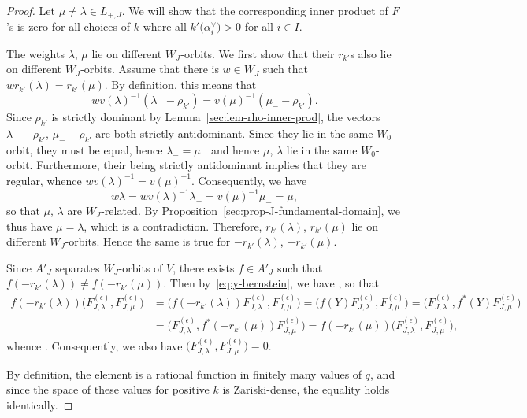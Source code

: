 \documentclass[10pt,a4paper]{amsart}
\theoremstyle{definition}
\numberwithin{equation}{section}
\begin{document}
\begin{proof}
 Let $\mu\ne \lambda\in L_{+,J}$. We will show that the corresponding inner product of $F$'s is zero for
 all choices of $k$ where all $k'\bigl(\alpha_i^\vee\bigr)>0$ for all $i\in I$.

 The weights $\lambda$, $\mu$ lie on different $W_J$-orbits. We first show that their $r_{k'}$s also lie on different $W_J$-orbits.
 Assume that there is $w\in W_J$ such that
 $wr_{k'}(\lambda)=r_{k'}(\mu)$. By definition, this means that
 \[
 wv(\lambda)^{-1}(\lambda_- - \rho_{k'})
 = v(\mu)^{-1}(\mu_- - \rho_{k'}).
 \]
 Since $\rho_{k'}$ is strictly dominant by Lemma~\ref{sec:lem-rho-inner-prod}, the vectors $\lambda_--\rho_{k'}$, $\mu_--\rho_{k'}$ are both
 strictly antidominant. Since they lie in the same $W_0$-orbit, they must be equal, hence
 $\lambda_-=\mu_-$ and hence $\mu$, $\lambda$ lie in the same $W_0$-orbit.
 Furthermore, their being strictly antidominant implies that they are
 regular, whence $wv(\lambda)^{-1} = v(\mu)^{-1}$. Consequently, we have
 \[
 w\lambda = wv(\lambda)^{-1}\lambda_-
 = v(\mu)^{-1}\mu_- = \mu,
 \]
 so that $\mu$, $\lambda$ are $W_J$-related. By Proposition~\ref{sec:prop-J-fundamental-domain}, we thus have $\mu=\lambda$, which is a contradiction.
 Therefore, $r_{k'}(\lambda)$, $r_{k'}(\mu)$ lie on different $W_J$-orbits.
 Hence the same is true for $-r_{k'}(\lambda)$, $-r_{k'}(\mu)$.

 Since $A'_J$ separates $W_J$-orbits of $V$, there exists $f\in A'_J$ such that $f(-r_{k'}(\lambda))\ne f(-r_{k'}(\mu))$. Then
 by~\eqref{eq:y-bernstein}, we have ,
 so that
 \begin{align*}
 f(-r_{k'}(\lambda)) \bigl(F^{(\epsilon)}_{J,\lambda}, F^{(\epsilon)}_{J,\mu}\bigr) &=
 \bigl(f(-r_{k'}(\lambda)) F^{(\epsilon)}_{J,\lambda}, F^{(\epsilon)}_{J,\mu}\bigr)= \bigl(f(Y)F^{(\epsilon)}_{J,\lambda}, F^{(\epsilon)}_{J,\mu}\bigr)= \bigl(F^{(\epsilon)}_{J,\lambda}, f^*(Y)F^{(\epsilon)}_{J,\mu}\bigr)\\
 &= \bigl(F^{(\epsilon)}_{J,\lambda}, f^*(-r_{k'}(\mu)) F^{(\epsilon)}_{J,\mu}\bigr)= f(-r_{k'}(\mu)) \bigl(F^{(\epsilon)}_{J,\lambda}, F^{(\epsilon)}_{J,\mu}\bigr),
 \end{align*}
 whence .
 Consequently, we also have
$
 \bigl(F^{(\epsilon)}_{J,\lambda},F^{(\epsilon)}_{J,\mu}\bigr)=0$.

 By definition, the element  is a rational function in finitely many values of $q$, and since the space of these values for positive $k$ is Zariski-dense, the equality  holds identically.
\end{proof}
\end{document}
